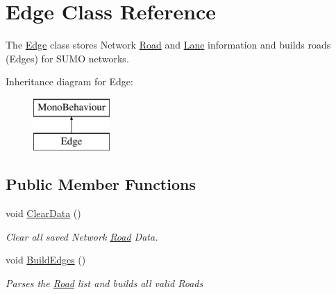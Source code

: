 \hypertarget{class_edge}{}\section{Edge Class Reference}
\label{class_edge}


The \mbox{\hyperlink{class_edge}{Edge}} class stores Network \mbox{\hyperlink{struct_road}{Road}} and \mbox{\hyperlink{struct_lane}{Lane}} information and builds roads (Edges) for S\+U\+MO networks.  


Inheritance diagram for Edge\+:\begin{figure}[H]
\begin{center}
\leavevmode
\includegraphics[height=2.000000cm]{class_edge}
\end{center}
\end{figure}
\subsection*{Public Member Functions}
\begin{DoxyCompactItemize}
\item 
void \mbox{\hyperlink{class_edge_a2ec64470c2a869696dfba6b5fdd9cf0b}{Clear\+Data}} ()
\begin{DoxyCompactList}\small\item\em Clear all saved Network \mbox{\hyperlink{struct_road}{Road}} Data. \end{DoxyCompactList}\item 
void \mbox{\hyperlink{class_edge_af671777176dc831d8a08e49f032fc763}{Build\+Edges}} ()
\begin{DoxyCompactList}\small\item\em Parses the \mbox{\hyperlink{struct_road}{Road}} list and builds all valid Roads \end{DoxyCompactList}\end{DoxyCompactItemize}
